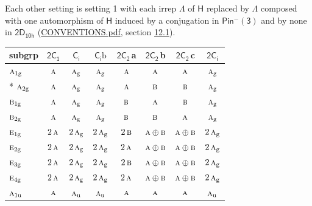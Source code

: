 \documentclass[10pt,a4paper]{article}
\numberwithin{equation}{section}
\newcommand{\grp}[1]{\mathsf{#1}}
\newcommand{\irr}[1]{\text{\normalfont\scshape #1}}
\newcommand{\ptag}[1]{\mathrm{#1}}
\newcommand{\clsletter}[1]{\,{\scriptsize\color{black!55}#1}}
\newcommand{\secondclass}{\mathrm{b}}
\begin{document}
\label{n:irrep.Delta}Each other setting is setting 1 with each irrep $\Lambda$ of $\grp{H}$ replaced by $\Lambda$ composed with one automorphism of $\grp{H}$ induced by a conjugation in \href{Pinminus3.pdf}{$\grp{Pin^{-}(3)}$} and by none in $\grp{2D_{10h}}$ (\href{../../CONVENTIONS.pdf}{CONVENTIONS.pdf}, section \href{../../../rotation/CONVENTIONS.pdf\#conv.12.1}{12.1}).
{\small\begin{longtable}{@{}lccccccc@{}}\toprule
subgrp & \href{2C1.pdf}{$\grp{2C_{1}}$} & \href{S2.pdf}{$\grp{C_{i}}$} & \href{S2b.pdf}{$\grp{C_{i}}\secondclass$} & \href{2C2.pdf}{$\grp{2C_{2}}$}\clsletter{a} & \href{2C2.pdf}{$\grp{2C_{2}}$}\clsletter{b} & \href{2C2.pdf}{$\grp{2C_{2}}$}\clsletter{c} & \href{2S2.pdf}{$\grp{2C_{i}}$}\\\midrule\endhead
\bottomrule\endfoot\endlastfoot
$\irr{a}_{1\ptag{g}}$ & $\irr{a}$ & $\irr{a}_{\ptag{g}}$ & $\irr{a}_{\ptag{g}}$ & $\irr{a}$ & $\irr{a}$ & $\irr{a}$ & $\irr{a}_{\ptag{g}}$\\*
$\irr{a}_{2\ptag{g}}$ & $\irr{a}$ & $\irr{a}_{\ptag{g}}$ & $\irr{a}_{\ptag{g}}$ & $\irr{a}$ & $\irr{b}$ & $\irr{b}$ & $\irr{a}_{\ptag{g}}$\\
$\irr{b}_{1\ptag{g}}$ & $\irr{a}$ & $\irr{a}_{\ptag{g}}$ & $\irr{a}_{\ptag{g}}$ & $\irr{b}$ & $\irr{a}$ & $\irr{b}$ & $\irr{a}_{\ptag{g}}$\\
$\irr{b}_{2\ptag{g}}$ & $\irr{a}$ & $\irr{a}_{\ptag{g}}$ & $\irr{a}_{\ptag{g}}$ & $\irr{b}$ & $\irr{b}$ & $\irr{a}$ & $\irr{a}_{\ptag{g}}$\\
$\irr{e}_{1\ptag{g}}$ & $2\,\irr{a}$ & $2\,\irr{a}_{\ptag{g}}$ & $2\,\irr{a}_{\ptag{g}}$ & $2\,\irr{b}$ & $\irr{a}\oplus \irr{b}$ & $\irr{a}\oplus \irr{b}$ & $2\,\irr{a}_{\ptag{g}}$\\
$\irr{e}_{2\ptag{g}}$ & $2\,\irr{a}$ & $2\,\irr{a}_{\ptag{g}}$ & $2\,\irr{a}_{\ptag{g}}$ & $2\,\irr{a}$ & $\irr{a}\oplus \irr{b}$ & $\irr{a}\oplus \irr{b}$ & $2\,\irr{a}_{\ptag{g}}$\\
$\irr{e}_{3\ptag{g}}$ & $2\,\irr{a}$ & $2\,\irr{a}_{\ptag{g}}$ & $2\,\irr{a}_{\ptag{g}}$ & $2\,\irr{b}$ & $\irr{a}\oplus \irr{b}$ & $\irr{a}\oplus \irr{b}$ & $2\,\irr{a}_{\ptag{g}}$\\
$\irr{e}_{4\ptag{g}}$ & $2\,\irr{a}$ & $2\,\irr{a}_{\ptag{g}}$ & $2\,\irr{a}_{\ptag{g}}$ & $2\,\irr{a}$ & $\irr{a}\oplus \irr{b}$ & $\irr{a}\oplus \irr{b}$ & $2\,\irr{a}_{\ptag{g}}$\\
$\irr{a}_{1\ptag{u}}$ & $\irr{a}$ & $\irr{a}_{\ptag{u}}$ & $\irr{a}_{\ptag{u}}$ & $\irr{a}$ & $\irr{a}$ & $\irr{a}$ & $\irr{a}_{\ptag{u}}$\\

\end{longtable}}
\end{document}

